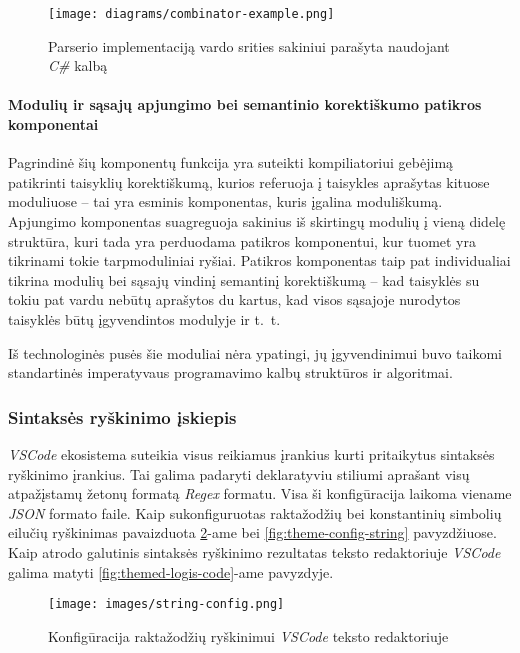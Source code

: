 \begin{activities}
{        \begin{figure}
            \centering
            \texttt{[image: diagrams/combinator-example.png]}
            \caption{Parserio implementaciją vardo srities sakiniui parašyta naudojant \textit{C\#} kalbą}
            \label{fig:combinator-example}
        \end{figure}

        \newpage

        \paragraph{Modulių ir sąsajų apjungimo bei semantinio korektiškumo patikros komponentai}

        Pagrindinė šių komponentų funkcija yra suteikti kompiliatoriui gebėjimą patikrinti taisyklių korektiškumą, kurios referuoja į taisykles aprašytas kituose moduliuose -- tai yra esminis komponentas, kuris įgalina moduliškumą. Apjungimo komponentas suagreguoja sakinius iš skirtingų modulių į vieną didelę struktūra, kuri tada yra perduodama patikros komponentui, kur tuomet yra tikrinami tokie tarpmoduliniai ryšiai. Patikros komponentas taip pat individualiai tikrina modulių bei sąsajų vindinį semantinį korektiškumą -- kad taisyklės su tokiu pat vardu nebūtų aprašytos du kartus, kad visos sąsajoje nurodytos taisyklės būtų įgyvendintos modulyje ir \hbox{t. t.}

        Iš technologinės pusės šie moduliai nėra ypatingi, jų įgyvendinimui buvo taikomi standartinės imperatyvaus programavimo kalbų struktūros ir algoritmai.
    
        \subsubsection{Sintaksės ryškinimo įskiepis}

        \textit{VSCode} ekosistema suteikia visus reikiamus įrankius kurti pritaikytus sintaksės ryškinimo įrankius. Tai galima padaryti deklaratyviu stiliumi aprašant visų atpažįstamų žetonų formatą \textit{Regex} formatu. Visa ši konfigūracija laikoma viename \textit{JSON} formato faile. Kaip sukonfiguruotas raktažodžių bei konstantinių simbolių eilučių ryškinimas pavaizduota \ref{fig:theme-config-keyword}-ame bei \ref{fig:theme-config-string} pavyzdžiuose. Kaip atrodo galutinis sintaksės ryškinimo rezultatas teksto redaktoriuje \textit{VSCode} galima matyti \ref{fig:themed-logis-code}-ame pavyzdyje.

        \begin{figure}
            \centering
            \texttt{[image: images/string-config.png]}
            \caption{Konfigūracija raktažodžių ryškinimui \textit{VSCode} teksto redaktoriuje}
            \label{fig:theme-config-keyword}
        \end{figure}

}
\end{activities}
